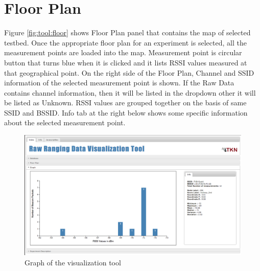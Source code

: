 \documentclass[11pt,a4paper,headinclude,footinclude,chapterprefix=on]{scrreprt}
\begin{document}
\section{Floor Plan} Figure \ref{fig:tool:floor} shows Floor Plan panel that contains the map of selected testbed. Once the appropriate floor plan for an experiment is selected, all the measurement points are loaded into the map. Measurement point is circular button that turns blue when it is clicked and it lists RSSI values measured at that geographical point. On the right side of the Floor Plan, Channel and SSID information of the selected measurement point is shown. If the Raw Data contains channel information, then it will be listed in the dropdown other it will be listed as Unknown. RSSI values are grouped together on the basis of same SSID and BSSID. Info tab at the right below shows some specific information about the selected measurement point. 
\begin{figure}
	[!h] \centering 
	\includegraphics[width=13cm]{Images/tool_graph.png} \caption{Graph of the visualization tool} \label{fig:tool:graph} 
\end{figure}
\end{document}

